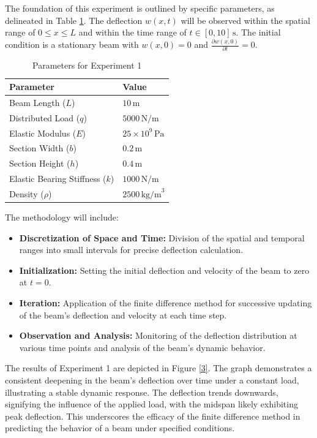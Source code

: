 \documentclass[conference]{IEEEtran}
\begin{document}
The foundation of this experiment is outlined by specific parameters, as delineated in Table \ref{tab:experiment1}. The deflection \( w(x, t) \) will be observed within the spatial range of \( 0 \leq x \leq L \) and within the time range of \( t \in [0, 10]\,\text{s} \). The initial condition is a stationary beam with \( w(x, 0)=0 \) and \( \frac{\partial w(x,0)}{\partial t} = 0 \).


\begin{table}[h]
\centering
\caption{Parameters for Experiment 1}
\label{tab:experiment1}
\begin{tabular}{l l}
\hline
\textbf{Parameter} & \textbf{Value} \\
\hline
Beam Length (\( L \)) & \( 10\,\text{m} \) \\
Distributed Load (\( q \)) & \( 5000\,\text{N/m} \) \\
Elastic Modulus (\( E \)) & \( 25 \times 10^9\,\text{Pa} \) \\
Section Width (\( b \)) & \( 0.2\,\text{m} \) \\
Section Height (\( h \)) & \( 0.4\,\text{m} \) \\
Elastic Bearing Stiffness (\( k \)) & \( 1000\,\text{N/m} \) \\
Density (\( \rho \)) & \( 2500\,\text{kg/m}^3 \) \\
\hline
\end{tabular}
\end{table}

The methodology will include:

\begin{itemize}
    \item \textbf{Discretization of Space and Time:} Division of the spatial and temporal ranges into small intervals for precise deflection calculation.
    \item \textbf{Initialization:} Setting the initial deflection and velocity of the beam to zero at \( t=0 \).
    \item \textbf{Iteration:} Application of the finite difference method for successive updating of the beam's deflection and velocity at each time step.
    \item \textbf{Observation and Analysis:} Monitoring of the deflection distribution at various time points and analysis of the beam's dynamic behavior.
\end{itemize}

The results of Experiment 1 are depicted in Figure \ref{3}. The graph demonstrates a consistent deepening in the beam's deflection over time under a constant load, illustrating a stable dynamic response. The deflection trends downwards, signifying the influence of the applied load, with the midspan likely exhibiting peak deflection. This underscores the efficacy of the finite difference method in predicting the behavior of a beam under specified conditions.
\end{document}
